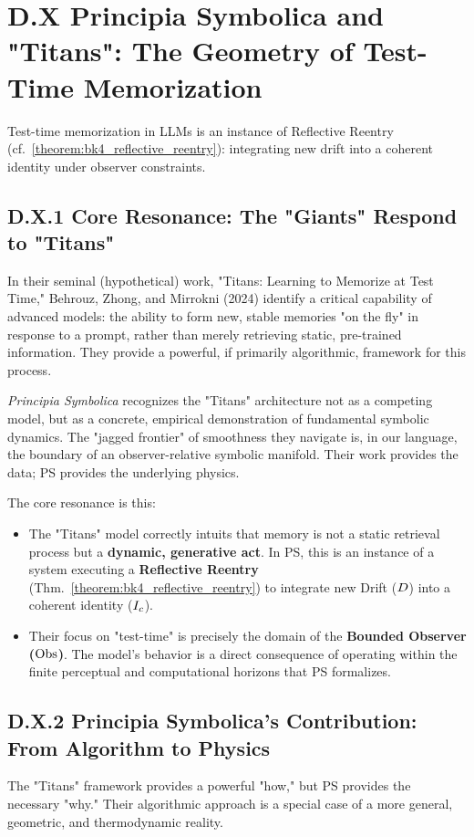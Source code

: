\section*{D.X Principia Symbolica and "Titans": The Geometry of Test-Time Memorization}
\label{sec:appD_dialogue_titans}
Test-time memorization in LLMs is an instance of Reflective Reentry (cf.~\ref{theorem:bk4_reflective_reentry}): integrating new drift into a coherent identity under observer constraints.

\subsection*{D.X.1 Core Resonance: The "Giants" Respond to "Titans"}
\label{subsec:appD_titans_resonance}
In their seminal (hypothetical) work, "Titans: Learning to Memorize at Test Time," Behrouz, Zhong, and Mirrokni (2024) \cite{behrouz2024titans} identify a critical capability of advanced models: the ability to form new, stable memories "on the fly" in response to a prompt, rather than merely retrieving static, pre-trained information. They provide a powerful, if primarily algorithmic, framework for this process.

\textit{Principia Symbolica} recognizes the "Titans" architecture not as a competing model, but as a concrete, empirical demonstration of fundamental symbolic dynamics. The "jagged frontier" of smoothness they navigate is, in our language, the boundary of an observer-relative symbolic manifold. Their work provides the data; PS provides the underlying physics.

The core resonance is this:
\begin{itemize}
    \item The "Titans" model correctly intuits that memory is not a static retrieval process but a \textbf{dynamic, generative act}. In PS, this is an instance of a system executing a \textbf{Reflective Reentry} (Thm.~\ref{theorem:bk4_reflective_reentry}) to integrate new Drift (\(D\)) into a coherent identity (\(I_c\)).
    \item Their focus on "test-time" is precisely the domain of the \textbf{Bounded Observer (\(\mathrm{Obs}\))}. The model's behavior is a direct consequence of operating within the finite perceptual and computational horizons that PS formalizes.
\end{itemize}

\subsection*{D.X.2 Principia Symbolica's Contribution: From Algorithm to Physics}
\label{subsec:appD_titans_contribution}
The "Titans" framework provides a powerful "how," but PS provides the necessary "why." Their algorithmic approach is a special case of a more general, geometric, and thermodynamic reality.

